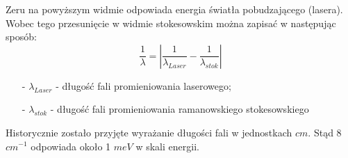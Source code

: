 Zeru na powyższym widmie odpowiada energia światła pobudzającego (lasera). Wobec tego przesunięcie w widmie stokesowskim można zapisać w następując sposób:
\begin{equation}
	\frac{1}{\lambda} = \left| \frac{1}{\lambda_{Laser}} - \frac{1}{\lambda_{stok}} \right|
\end{equation}
\begin{itemize}
	\item[-]{$\lambda_{Laser}$ - długość fali promieniowania laserowego};
	\item[-]{$\lambda_{stok}$ - długość fali promieniowania ramanowskiego stokesowskiego}
\end{itemize}

Historycznie zostało przyjęte wyrażanie długości fali w jednostkach $cm$. Stąd 8 $cm^{-1}$ odpowiada około 1 $meV$ w skali energii.













